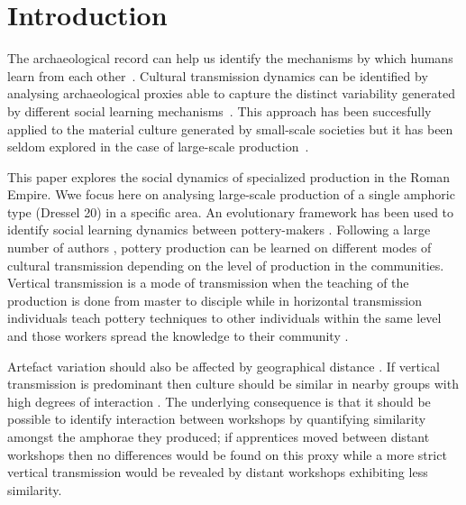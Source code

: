 \documentclass[review]{elsarticle}
\begin{document}


\section{Introduction}

The archaeological record can help us identify the mechanisms by which humans learn from each other~\citep{richerson2005not,schillinger_copying_2016}. Cultural transmission dynamics can be identified by analysing archaeological proxies able to capture the distinct variability generated by different social learning mechanisms~\citep{shennan_ceramic_2001,eerkens_jelmer_cultural_2005}. This approach has been succesfully applied to the material culture generated by small-scale societies but it has been seldom explored in the case of large-scale production~\citep{shennan_isolation-by-distance_2015,neff1992ceramics}.

This paper explores the social dynamics of specialized production in the Roman Empire. Wwe focus here on analysing large-scale production of a single amphoric type (Dressel 20) in a specific area. An evolutionary framework has been used to identify social learning dynamics between pottery-makers \citep{mesoudi_cultural_2015, shennan_evolution_2008}. Following a large number of authors \citep{cavalli-sforza_cultural_1981, hosfield_modes_2009}, pottery production can be learned on different modes of cultural transmission depending on the level of production in the communities. Vertical transmission is a mode of transmission when the teaching of the production is done from master to disciple while in horizontal transmission individuals teach pottery techniques to other individuals within the same level and those workers spread the knowledge to their community \citep{epstein_craft_1998}.

Artefact variation should also be affected by geographical distance \citep{bjorklund_effect_2010,shennan_isolation-by-distance_2015, van_strien_isolation-by-distance_2015}. If vertical transmission is predominant then culture should be similar in nearby groups with high degrees of interaction \citep{hart_effects_2012}. The underlying consequence is that it should be possible to identify interaction between workshops by quantifying similarity amongst the amphorae they produced; if apprentices moved between distant workshops then no differences would be found on this proxy while a more strict vertical transmission would be revealed by distant workshops exhibiting less similarity.
\end{document}
